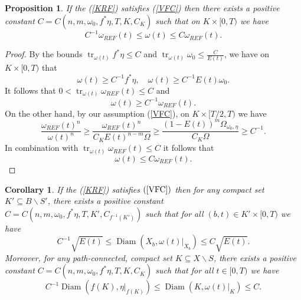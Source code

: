 \documentclass[12pt]{article}
\newtheorem{proposition}[theorem]{Proposition}
\newtheorem{corollary}[theorem]{Corollary}
\numberwithin{equation}{section}
\DeclareMathOperator{\tr}{tr}
\DeclareMathOperator{\Diam}{Diam}
\begin{document}
\begin{proposition}
If the (\ref{KRF}) satisfies (\ref{VFC}) then there exists a positive constant $C = C(n,m,\omega_0,f^*\eta,T,K,C_K)$ such that on $K \times [0,T)$ we have
\begin{equation*}
    C^{-1} \omega_{REF}(t) \leq \omega(t) \leq C \omega_{REF}(t).
\end{equation*}
\end{proposition}

\begin{proof}
By the bounds $\tr_{\omega(t)} f^* \eta \leq C$ and $\tr_{\omega(t)} \omega_0 \leq \frac{C}{E(t)}$, we have on $K \times [0,T)$ that
\begin{equation*}
    \omega(t) \geq C^{-1} f^*\eta, \quad \omega(t) \geq C^{-1} E(t) \omega_0.
\end{equation*}
It follows that $0 < \tr_{\omega(t)} \omega_{REF}(t) \leq C$ and
\begin{equation*}
    \omega(t) \geq C^{-1} \omega_{REF}(t).
\end{equation*}
On the other hand, by our assumption (\ref{VFC}), on $K \times [T/2, T)$ we have
\begin{equation*}
    \frac{\omega_{REF}(t)^n}{\omega(t)^n} \geq \frac{\omega_{REF}(t)^n}{C_K E(t)^{n-m} \Omega} \geq \frac{(1-E(t))^m \Omega_{\omega_0,\eta}}{C_K \Omega} \geq C^{-1}.
\end{equation*}
In combination with $\tr_{\omega(t)} \omega_{REF}(t) \leq C$ it follows that
\begin{equation*}
    \omega(t) \leq C \omega_{REF}(t).
\end{equation*}
\end{proof}

\begin{corollary}
If the (\ref{KRF}) satisfies $(\ref{VFC})$ then for any compact set $K' \subseteq B\backslash S'$, there exists a positive constant $C = C(n,m,\omega_0,f^*\eta,T, K', C_{f^{-1}(K')})$ such that for all $(b,t) \in K' \times[0,T)$ we have
\begin{equation*}
     C^{-1} \sqrt{E(t)} \leq \Diam(X_b, \omega(t)|_{X_b}) \leq C \sqrt{E(t)}.
\end{equation*}
Moreover, for any path-connected, compact set $K \subseteq X \backslash S$, there exists a positive constant $C = C(n,m,\omega_0,f^*\eta,T,K,C_K)$ such that for all $t\in [0,T)$ we have
\begin{equation*}
    C^{-1}\Diam(f(K),\eta|_{f(K)}) \leq \Diam(K, \omega(t)|_K) \leq C.
\end{equation*}
\end{corollary}
\end{document}
